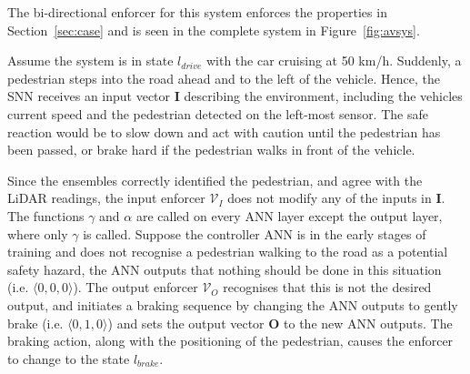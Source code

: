 The bi-directional enforcer for this system enforces the properties in Section~\ref{sec:case} %
and is seen in the complete system in Figure~\ref{fig:avsys}.

\begin{example}
	Assume the system is in state $l_{drive}$ with the car cruising at 50 km/h.
	Suddenly, a pedestrian steps into the road ahead and to the left of the vehicle.
	Hence, the \ac{SNN} receives an input vector $\mathbf{I}$ describing the environment, including the vehicles current speed and the pedestrian detected on the left-most sensor.%
	The safe reaction would be to slow down and act with caution until the pedestrian has been passed, or brake hard if the pedestrian walks in front of the vehicle.
	
	Since the ensembles correctly identified the pedestrian, and agree with the \ac{LiDAR} readings, the input enforcer $\mathcal{V}_I$ does not modify any of the inputs in $\mathbf{I}$.
	The functions $\gamma$ and $\alpha$ are called on every \ac{ANN} layer except the output layer, where only $\gamma$ is called.
	Suppose the controller \ac{ANN} is in the early stages of training and does not recognise a pedestrian walking to the road as a potential safety hazard, the \ac{ANN} outputs that nothing should be done in this situation (i.e. $\langle 0, 0, 0 \rangle$).
	The output enforcer $\mathcal{V}_O$ recognises that this is not the desired output, and initiates a braking sequence by changing the \ac{ANN} outputs to gently brake (i.e. $\langle 0, 1, 0 \rangle$) and sets the output vector $\mathbf{O}$ to the new \ac{ANN} outputs.
	The braking action, along with the positioning of the pedestrian, causes the enforcer to change to the state $l_{brake}$.
\end{example}

